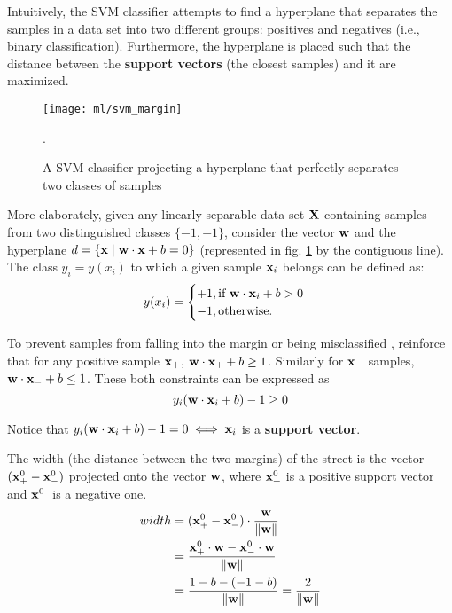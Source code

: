 Intuitively, the SVM classifier attempts to find a hyperplane that separates the samples in a data set into two different groups: positives and negatives (i.e., binary classification). Furthermore, the hyperplane is placed such that the distance between the \textbf{support vectors} (the closest samples) and it are maximized.

\begin{figure}[H]
	\centering
	\captionsetup{justification=centering}

	\texttt{[image: ml/svm\_margin]}
	\caption{A SVM classifier projecting a hyperplane that perfectly separates two classes of samples \cite{sksvm}}.
	\label{fig:svmmargin}
\end{figure}

More elaborately, given any linearly separable data set $\mathbf{X}$ containing samples from two distinguished classes $\{-1, +1\}$, consider the vector $\mathbf{w}$ and the hyperplane $d = \{\mathbf{x} \mid \mathbf{w} \cdot \mathbf{x} + b = 0\}$ (represented in fig. \ref{fig:svmmargin} by the contiguous line). The class $y_i = y(x_i)$ to which a given sample $\mathbf{x}_i$ belongs can be defined as:
\begin{align*}
	y(x_i) = \begin{cases}
		+1, \text{if } \mathbf{w} \cdot \mathbf{x}_i +b > 0 \\
		-1, \text{otherwise.}
	\end{cases}
\end{align*}

To prevent samples from falling into the margin or being misclassified \cite{wessvmdef}, reinforce that for any positive sample $\mathbf{x}_+$, $\mathbf{w} \cdot \mathbf{x}_+ +b \geq 1$. Similarly for $\mathbf{x}_-$ samples, $\mathbf{w} \cdot \mathbf{x}_- +b \leq 1$. These both constraints can be expressed as
\begin{equation} \label{svmconst}
y_i(\mathbf{w} \cdot \mathbf{x}_i +b) -1 \geq 0
\end{equation}

Notice that $y_i(\mathbf{w} \cdot \mathbf{x}_i +b) -1 = 0 \iff \mathbf{x}_i $ is a \textbf{support vector}.

The width (the distance between the two margins) of the street is the vector $(\mathbf{x}_+^0 - \mathbf{x}_-^0)$ projected onto the vector $\mathbf{w}$, where $\mathbf{x}_+^0$ is a positive support vector and $\mathbf{x}_-^0$ is a negative one.
\begin{equation} \label{eq:eqsvmwidth}
\begin{split}
width &= (\mathbf{x}_+^0 - \mathbf{x}_-^0) \cdot \frac{\mathbf{w}}{\|\mathbf{w}\|} \\
      &=\frac{\mathbf{x}_+^0 \cdot \mathbf{w} - \mathbf{x}_-^0 \cdot \mathbf{w}}{\|\mathbf{w}\|} \\
      &=\frac{1-b - (-1-b)}{\|\mathbf{w}\|} = \frac{2}{\|\mathbf{w}\|}
\end{split}
\end{equation}

